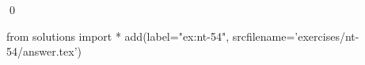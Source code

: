 
\begin{ex} 
  \label{ex:nt-54}
  
  \qed
\end{ex} 
\begin{python0}
from solutions import *
add(label="ex:nt-54",
    srcfilename='exercises/nt-54/answer.tex') 
\end{python0}
